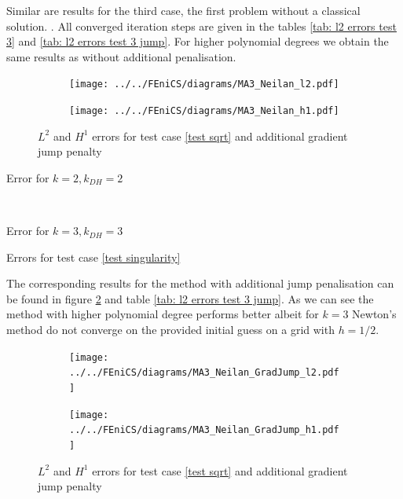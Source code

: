 Similar are results for the third case, the first problem without a classical solution. . All converged iteration steps are given in the tables \ref{tab: l2 errors test 3} and \ref{tab: l2 errors test 3 jump}. For higher polynomial degrees we obtain the same results as without additional penalisation. 
\begin{figure}[H]
	\centering
	\begin{subfigure}{\textwidth}
		\centering
		\texttt{[image: ../../FEniCS/diagrams/MA3\_Neilan\_l2.pdf]}
	\end{subfigure}
	
	\begin{subfigure}{\textwidth}
		\centering
		\texttt{[image: ../../FEniCS/diagrams/MA3\_Neilan\_h1.pdf]}
	\end{subfigure}
	\caption{$L^2$ and $H^1$ errors for test case \ref{test sqrt} and additional gradient jump penalty}
	\label{fig: l2 errors test 3}
\end{figure}
\begin{table}[H]
	\begin{subtable}[b]{0.45\textwidth}
		\centering
    	\caption{Error for $k=2, k_{DH}=2$}
   \end{subtable}
   ~
	\begin{subtable}[b]{0.45\textwidth}
		\centering
	\caption{Error for $k=3, k_{DH}=3$}
	\end{subtable}
	\caption{Errors for test case \ref{test singularity}}
	\label{tab: l2 errors test 3}
\end{table}

The corresponding results for the method with additional jump penalisation can be found in figure \ref{fig: l2 errors test 3 jump} and table \ref{tab: l2 errors test 3 jump}. As we can see the method with higher polynomial degree performs better albeit for $k=3$ Newton's method do not converge on the provided initial guess on a grid with $h=1/2$.
\begin{figure}[H]
	\centering
	\begin{subfigure}{\textwidth}
		\centering
		\texttt{[image: ../../FEniCS/diagrams/MA3\_Neilan\_GradJump\_l2.pdf]}
	\end{subfigure}
	
	\begin{subfigure}{\textwidth}
		\centering
		\texttt{[image: ../../FEniCS/diagrams/MA3\_Neilan\_GradJump\_h1.pdf]}
	\end{subfigure}
	\caption{$L^2$ and $H^1$ errors for test case \ref{test sqrt} and additional gradient jump penalty}
	\label{fig: l2 errors test 3 jump}
\end{figure}

